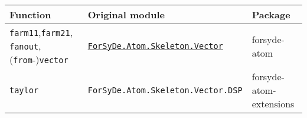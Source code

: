 \documentclass[
  a4paper,
]{article}
\newenvironment{Shaded}{}{}
\newcommand{\CommentTok}[1]{\textcolor[rgb]{0.38,0.63,0.69}{\textit{#1}}}
\newcommand{\DataTypeTok}[1]{\textcolor[rgb]{0.56,0.13,0.00}{#1}}
\newcommand{\FunctionTok}[1]{\textcolor[rgb]{0.02,0.16,0.49}{#1}}
\newcommand{\NormalTok}[1]{#1}
\newcommand{\OtherTok}[1]{\textcolor[rgb]{0.00,0.44,0.13}{#1}}
\begin{document}
\begin{Shaded}
\end{Shaded}

\begin{longtable}[]{@{}lll@{}}
\toprule
\begin{minipage}[b]{0.23\columnwidth}\raggedright
Function\strut
\end{minipage} & \begin{minipage}[b]{0.41\columnwidth}\raggedright
Original module\strut
\end{minipage} & \begin{minipage}[b]{0.28\columnwidth}\raggedright
Package\strut
\end{minipage}\tabularnewline
\midrule
\endhead
\begin{minipage}[t]{0.23\columnwidth}\raggedright
\texttt{farm11},\texttt{farm21}, \texttt{fanout},
(\texttt{from}-)\texttt{vector}\strut
\end{minipage} & \begin{minipage}[t]{0.41\columnwidth}\raggedright
\href{https://forsyde.github.io/forsyde-atom/api/ForSyDe-Atom-Skeleton-Vector.html}{\texttt{ForSyDe.Atom.Skeleton.Vector}}\strut
\end{minipage} & \begin{minipage}[t]{0.28\columnwidth}\raggedright
forsyde-atom\strut
\end{minipage}\tabularnewline
\begin{minipage}[t]{0.23\columnwidth}\raggedright
\texttt{taylor}\strut
\end{minipage} & \begin{minipage}[t]{0.41\columnwidth}\raggedright
\texttt{ForSyDe.Atom.Skeleton.Vector.DSP}\strut
\end{minipage} & \begin{minipage}[t]{0.28\columnwidth}\raggedright
forsyde-atom-extensions\strut
\end{minipage}\tabularnewline
\bottomrule
\end{longtable}
\end{document}
